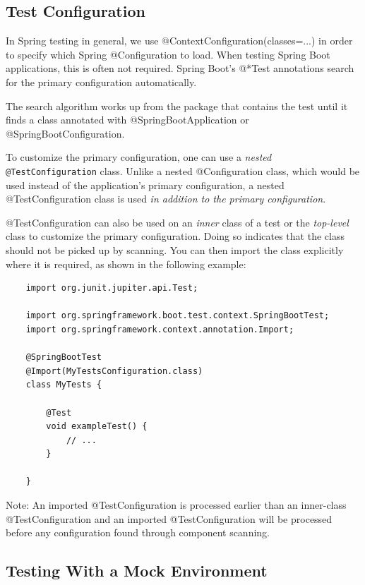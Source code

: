\documentclass{scrartcl}
\begin{document}
\subsection{Test Configuration}

In Spring testing in general, we use @ContextConfiguration(classes=...) in order to specify which Spring @Configuration to load.
When testing Spring Boot applications, this is often not required. Spring Boot’s @*Test annotations search for the primary configuration automatically.

The search algorithm works up from the package that contains the test until it finds a class annotated with @SpringBootApplication or @SpringBootConfiguration.

To customize the primary configuration, one can use a \textit{nested} \lstinline|@TestConfiguration| class. Unlike a nested @Configuration class, which would be used instead of the application’s primary configuration, a nested @TestConfiguration class is used \textit{in addition to the primary configuration}.

@TestConfiguration can also be used on an \textit{inner} class of a test or the \textit{top-level} class to customize the primary configuration. Doing so indicates that the class should not be picked up by scanning. You can then import the class explicitly where it is required, as shown in the following example:

\begin{lstlisting}
    import org.junit.jupiter.api.Test;

    import org.springframework.boot.test.context.SpringBootTest;
    import org.springframework.context.annotation.Import;

    @SpringBootTest
    @Import(MyTestsConfiguration.class)
    class MyTests {

        @Test
        void exampleTest() {
            // ...
        }

    }
\end{lstlisting}

Note: An imported @TestConfiguration is processed earlier than an inner-class @TestConfiguration and an imported @TestConfiguration will be processed before any configuration found through component scanning.

\subsection{Testing With a Mock Environment}
\end{document}

